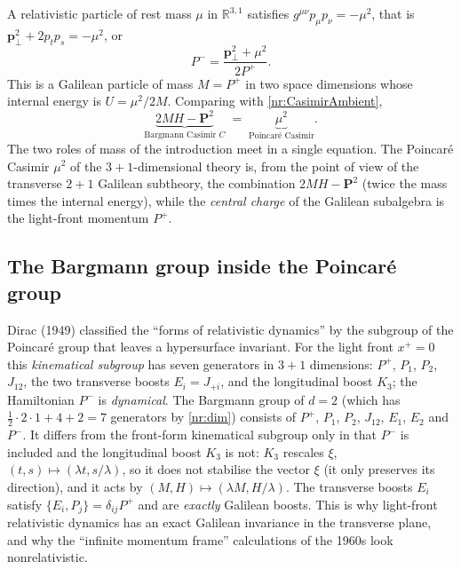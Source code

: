 A relativistic particle of rest mass $\mu$ in $\mathbb{R}^{3,1}$ satisfies
$g^{\mu\nu}p_\mu p_\nu=-\mu^2$, that is $\mathbf{p}_\perp^2+2p_tp_s=-\mu^2$, or
\begin{equation}
  P^-=\frac{\mathbf{p}_\perp^2+\mu^2}{2P^+}.
  \label{nr:lfdispersion}
\end{equation}
This is a Galilean particle of mass $M=P^+$ in two space dimensions whose
internal energy is $U=\mu^2/2M$. Comparing with \eqref{nr:CasimirAmbient},
\begin{equation}
  \underbrace{2MH-\mathbf{P}^2}_{\text{Bargmann Casimir } C}
  \;=\;\underbrace{\mu^2}_{\text{Poincar\'e Casimir}} .
  \label{nr:twoCasimirs}
\end{equation}
The two roles of mass of the introduction meet in a single equation. The
Poincar\'e Casimir $\mu^2$ of the $3{+}1$-dimensional theory is, from the point
of view of the transverse $2{+}1$ Galilean subtheory, the combination
$2MH-\mathbf{P}^2$ (twice the mass times the internal energy), while the
\emph{central charge} of the Galilean subalgebra is the light-front momentum
$P^+$.

\subsection{The Bargmann group inside the Poincar\'e group}

Dirac (1949) classified the ``forms of relativistic dynamics'' by the subgroup
of the Poincar\'e group that leaves a hypersurface invariant. For the light
front $x^+=0$ this \emph{kinematical subgroup} has seven generators in
$3{+}1$ dimensions: $P^+$, $P_1$, $P_2$, $J_{12}$, the two transverse boosts
$E_i=J_{+i}$, and the longitudinal boost $K_3$; the Hamiltonian $P^-$ is
\emph{dynamical}. The Bargmann group of $d=2$ (which has $\tfrac12\cdot2\cdot1+4+2=7$
generators by \eqref{nr:dim}) consists of $P^+$, $P_1$, $P_2$, $J_{12}$, $E_1$, $E_2$
and $P^-$. It differs from the front-form kinematical subgroup only in that
$P^-$ is included and the longitudinal boost $K_3$ is not: $K_3$ rescales
$\xi$, $(t,s)\mapsto(\lambda t,s/\lambda)$, so it does not stabilise the vector
$\xi$ (it only preserves its direction), and it acts by $(M,H)\mapsto(\lambda M,H/\lambda)$.
The transverse boosts $E_i$ satisfy $\{E_i,P_j\}=\delta_{ij}P^+$ and are
\emph{exactly} Galilean boosts. This is why light-front relativistic dynamics
has an exact Galilean invariance in the transverse plane, and why the
``infinite momentum frame'' calculations of the 1960s look nonrelativistic.

